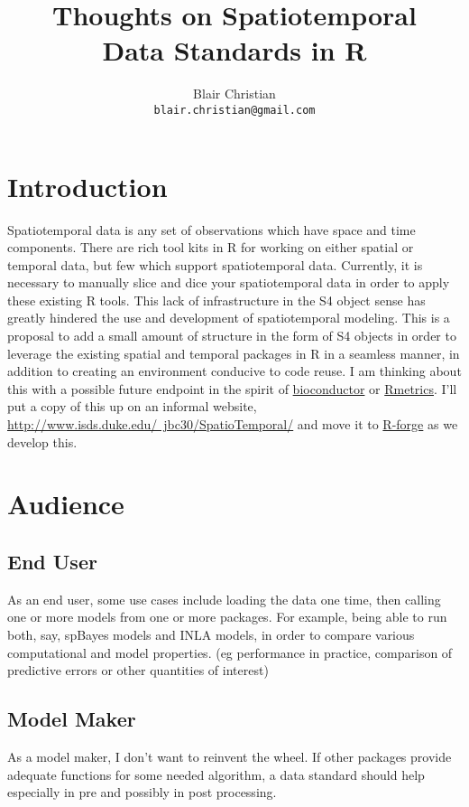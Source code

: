 \documentclass[12pt]{article}
\title{Thoughts on Spatiotemporal \\
  Data Standards in R}
\author{Blair Christian\\
\texttt{blair.christian@gmail.com}}
\date{}
\begin{document}
\maketitle

\section*{Introduction}
Spatiotemporal data is any set of observations which have space and
time components.  There are rich tool kits in R for working on either
spatial or temporal data, but few which support spatiotemporal data.
Currently, it is necessary to manually slice and dice your
spatiotemporal data in order to apply these existing R tools.  This
lack of infrastructure in the S4 object sense has greatly hindered the
use and development of spatiotemporal modeling.  This is a proposal
to add a small amount of structure in the form of S4 objects in order
to leverage the existing spatial and temporal packages in R in a
seamless manner, in addition to creating an environment conducive to
code reuse.  I am thinking about this with a possible future endpoint in
the spirit of \href{http://www.bioconductor.org}{bioconductor} or \href{http://www.rmetrics.org/}{Rmetrics}.  I'll
put a copy of this up on an informal website,
\href{http://www.isds.duke.edu/~jbc30/SpatioTemporal/}{http://www.isds.duke.edu/~jbc30/SpatioTemporal/}
and move it to \href{http://r-forge.r-project.org}{R-forge} as we develop
this.  


\section*{Audience}

\subsection*{End User}
As an end user, some use cases include loading the data one time, then
calling one or more models from one or more packages.  For example,
being able to run both, say, spBayes models and INLA models, in order
to compare various computational and model properties.  (eg
performance in practice, comparison of predictive errors or other
quantities of interest)


\subsection*{Model Maker}
As a model maker, I don't want to reinvent the wheel.  If other
packages provide adequate functions for some needed algorithm, a data
standard should help especially in pre and possibly in post
processing. 
\end{document}

